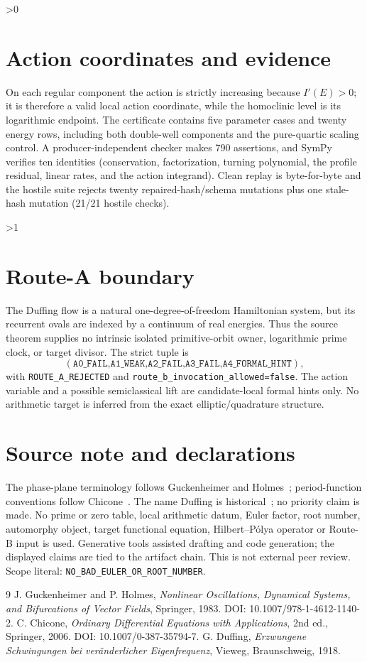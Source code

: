 \documentclass[11pt]{article}
\begin{document}
\ifnum\CRevisionRound>0
\section{Action coordinates and evidence}
On each regular component the action is strictly increasing because
$I'(E)>0$; it is therefore a valid local action coordinate, while the
homoclinic level is its logarithmic endpoint.  The certificate contains five
parameter cases and twenty energy rows, including both double-well components
and the pure-quartic scaling control.  A producer-independent checker makes
790 assertions, and SymPy verifies ten identities (conservation, factorization,
turning polynomial, the profile residual, linear rates, and the action
integrand).  Clean replay is byte-for-byte and the hostile suite rejects
twenty repaired-hash/schema mutations plus one stale-hash mutation
(21/21 hostile checks).
\fi

\ifnum\CRevisionRound>1
\section{Route-A boundary}
The Duffing flow is a natural one-degree-of-freedom Hamiltonian system, but
its recurrent ovals are indexed by a continuum of real energies.  Thus the
source theorem supplies no intrinsic isolated primitive-orbit owner, logarithmic
prime clock, or target divisor.  The strict tuple is
\[
 (\texttt{A0\_FAIL,A1\_WEAK,A2\_FAIL,A3\_FAIL,A4\_FORMAL\_HINT}),
\]
with \texttt{ROUTE\_A\_REJECTED} and
\texttt{route\_b\_invocation\_allowed=false}.  The action variable and a
possible semiclassical lift are candidate-local formal hints only.  No
arithmetic target is inferred from the exact elliptic/quadrature structure.
\fi

\section*{Source note and declarations}
The phase-plane terminology follows Guckenheimer and Holmes~\cite{GH1983};
period-function conventions follow Chicone~\cite{Chicone2006}.  The name
Duffing is historical~\cite{Duffing1918}; no priority claim is made.  No
prime or zero table, local arithmetic datum, Euler factor, root number,
automorphy object, target functional equation, Hilbert--Pólya operator or
Route-B input is used.  Generative tools assisted drafting and code generation;
the displayed claims are tied to the artifact chain.  This is not external
peer review.  Scope literal: \texttt{NO\_BAD\_EULER\_OR\_ROOT\_NUMBER}.

\begin{thebibliography}{9}
 J. Guckenheimer and P. Holmes,
\emph{Nonlinear Oscillations, Dynamical Systems, and Bifurcations of Vector
Fields}, Springer, 1983. DOI: 10.1007/978-1-4612-1140-2.
 C. Chicone, \emph{Ordinary Differential Equations with
Applications}, 2nd ed., Springer, 2006. DOI: 10.1007/0-387-35794-7.
 G. Duffing, \emph{Erzwungene Schwingungen bei
veränderlicher Eigenfrequenz}, Vieweg, Braunschweig, 1918.
\end{thebibliography}
\end{document}
